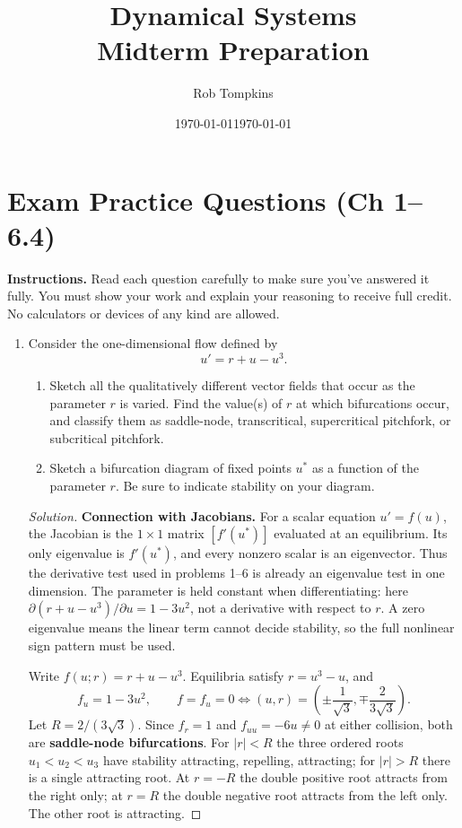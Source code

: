 \documentclass[10pt]{amsart}
\title{Dynamical Systems\\Midterm Preparation}
\author{Rob Tompkins}
\date{\today}
\newenvironment{solution}
{\begin{proof}[Solution]}
{\end{proof}}
\begin{document}
    \raggedbottom
    \maketitle
    \date{\today}

\section*{Exam Practice Questions (Ch 1--6.4)}
\noindent\textbf{Instructions.} Read each question carefully to make sure you've answered it fully. You must show your work and explain your reasoning to receive full credit. No calculators or devices of any kind are allowed.

\begin{enumerate}[label=\arabic*), leftmargin=*, itemsep=1em]
    \item Consider the one-dimensional flow defined by
    \[
        u' = r + u - u^3.
    \]
    \begin{enumerate}[label=(\alph*)]
        \item Sketch all the qualitatively different vector fields that occur as the parameter $r$ is varied. Find the value(s) of $r$ at which bifurcations occur, and classify them as saddle-node, transcritical, supercritical pitchfork, or subcritical pitchfork.
        \item Sketch a bifurcation diagram of fixed points $u^*$ as a function of the parameter $r$. Be sure to indicate stability on your diagram.
    \end{enumerate}

    \begin{solution}

\noindent\textbf{Connection with Jacobians.} For a scalar equation $u'=f(u)$, the Jacobian is the $1\times1$ matrix $[f'(u^*)]$ evaluated at an equilibrium. Its only eigenvalue is $f'(u^*)$, and every nonzero scalar is an eigenvector. Thus the derivative test used in problems 1--6 is already an eigenvalue test in one dimension. The parameter is held constant when differentiating: here $\partial(r+u-u^3)/\partial u=1-3u^2$, not a derivative with respect to $r$. A zero eigenvalue means the linear term cannot decide stability, so the full nonlinear sign pattern must be used.


Write $f(u;r)=r+u-u^3$. Equilibria satisfy $r=u^3-u$, and
\[
 f_u=1-3u^2,\qquad f=f_u=0\iff (u,r)=\left(\pm\frac1{\sqrt3},\mp\frac2{3\sqrt3}\right).
\]
Let $R=2/(3\sqrt3)$. Since $f_r=1$ and $f_{uu}=-6u\ne0$ at either collision, both are \textbf{saddle-node bifurcations}. For $|r|<R$ the three ordered roots $u_1<u_2<u_3$ have stability attracting, repelling, attracting; for $|r|>R$ there is a single attracting root. At $r=-R$ the double positive root attracts from the right only; at $r=R$ the double negative root attracts from the left only. The other root is attracting.


\end{solution}
\end{enumerate}
\end{document}
